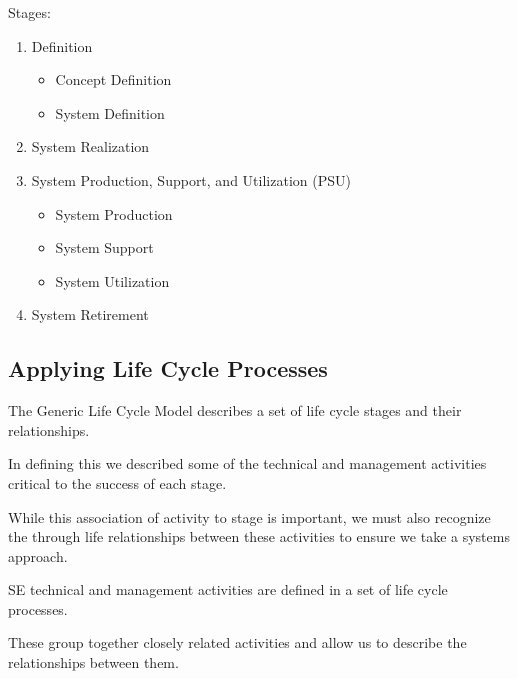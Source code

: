 \documentclass[letterpaper,10pt,english]{jupyterBook}
\begin{document}
\sphinxAtStartPar
Stages:
\begin{enumerate}
%
\item {} 
\sphinxAtStartPar
Definition
\begin{itemize}
\item {} 
\sphinxAtStartPar
Concept Definition

\item {} 
\sphinxAtStartPar
System Definition

\end{itemize}

\item {} 
\sphinxAtStartPar
System Realization

\item {} 
\sphinxAtStartPar
System Production, Support, and Utilization (PSU)
\begin{itemize}
\item {} 
\sphinxAtStartPar
System Production

\item {} 
\sphinxAtStartPar
System Support

\item {} 
\sphinxAtStartPar
System Utilization

\end{itemize}

\item {} 
\sphinxAtStartPar
System Retirement

\end{enumerate}


\subsection{Applying Life Cycle Processes}
\label{\detokenize{SE/sebok:applying-life-cycle-processes}}
\sphinxAtStartPar
The Generic Life Cycle Model describes a set of life cycle stages and their relationships.

\sphinxAtStartPar
In defining this we described some of the technical and management activities critical to the success of each stage.

\sphinxAtStartPar
While this association of activity to stage is important, we must also recognize the through life relationships between these activities to ensure we take a systems approach.

\sphinxAtStartPar
SE technical and management activities are defined in a set of life cycle processes.

\sphinxAtStartPar
These group together closely related activities and allow us to describe the relationships between them.
\end{document}
